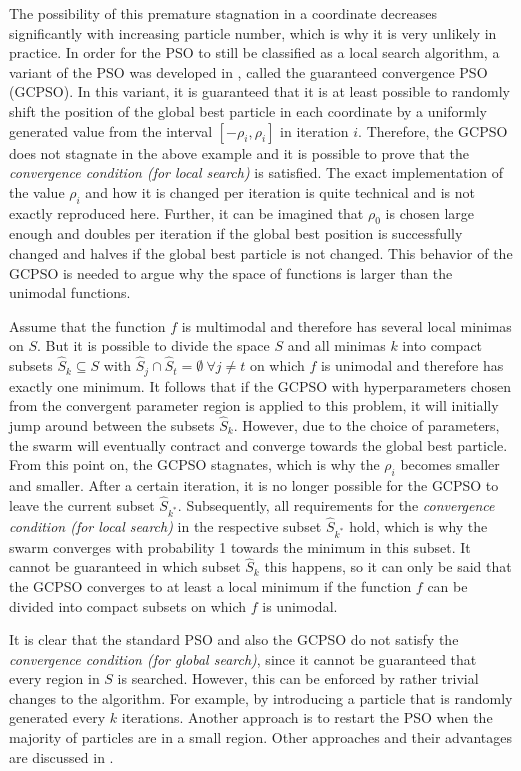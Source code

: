 \documentclass[
  oneside, a4paper, 12pt, openany]{book}
\theoremstyle{definition}
\theoremstyle{definition}
\theoremstyle{definition}
\theoremstyle{definition}
\theoremstyle{remark}
\begin{document}
The possibility of this premature stagnation in a coordinate decreases significantly with increasing particle number, which is why it is very unlikely in practice. In order for the PSO to still be classified as a local search algorithm, a variant of the PSO was developed in \citep{FbEn2010}, called the guaranteed convergence PSO (GCPSO). In this variant, it is guaranteed that it is at least possible to randomly shift the position of the global best particle in each coordinate by a uniformly generated value from the interval \([-\rho_i, \rho_i]\) in iteration \(i\). Therefore, the GCPSO does not stagnate in the above example and it is possible to prove that the \emph{convergence condition (for local search)} is satisfied. The exact implementation of the value \(\rho_i\) and how it is changed per iteration is quite technical and is not exactly reproduced here. Further, it can be imagined that \(\rho_0\) is chosen large enough and doubles per iteration if the global best position is successfully changed and halves if the global best particle is not changed. This behavior of the GCPSO is needed to argue why the space of functions is larger than the unimodal functions.

Assume that the function \(f\) is multimodal and therefore has several local minimas on \(S\). But it is possible to divide the space \(S\) and all minimas \(k\) into compact subsets \(\hat{S}_k \subseteq S\) with \(\hat{S}_j \cap \hat{S}_t = \emptyset \ \forall j\neq t\) on which \(f\) is unimodal and therefore has exactly one minimum. It follows that if the GCPSO with hyperparameters chosen from the convergent parameter region is applied to this problem, it will initially jump around between the subsets \(\hat{S}_k\). However, due to the choice of parameters, the swarm will eventually contract and converge towards the global best particle. From this point on, the GCPSO stagnates, which is why the \(\rho_i\) becomes smaller and smaller. After a certain iteration, it is no longer possible for the GCPSO to leave the current subset \(\hat{S}_{k^*}\). Subsequently, all requirements for the \emph{convergence condition (for local search)} in the respective subset \(\hat{S}_{k^*}\) hold, which is why the swarm converges with probability 1 towards the minimum in this subset. It cannot be guaranteed in which subset \(\hat{S}_k\) this happens, so it can only be said that the GCPSO converges to at least a local minimum if the function \(f\) can be divided into compact subsets on which \(f\) is unimodal.

It is clear that the standard PSO and also the GCPSO do not satisfy the \emph{convergence condition (for global search)}, since it cannot be guaranteed that every region in \(S\) is searched. However, this can be enforced by rather trivial changes to the algorithm. For example, by introducing a particle that is randomly generated every \(k\) iterations. Another approach is to restart the PSO when the majority of particles are in a small region. Other approaches and their advantages are discussed in \citep{FbEn2010}.
\end{document}
